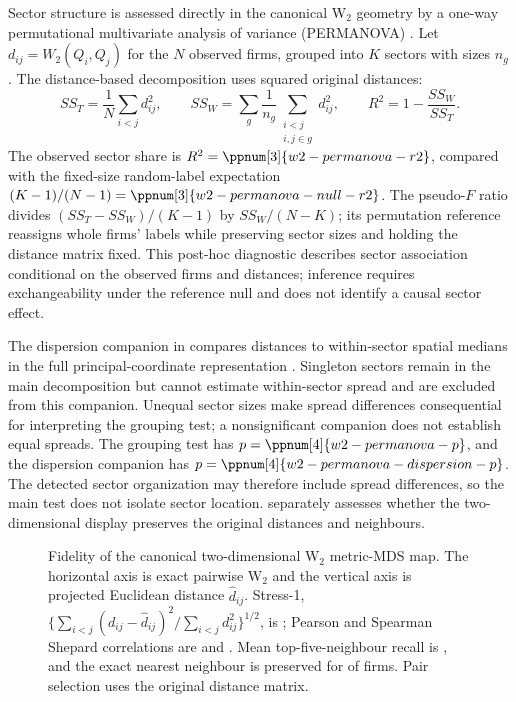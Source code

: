 Sector structure is assessed directly in the canonical W$_2$ geometry by a
one-way permutational multivariate analysis of variance (PERMANOVA)
\citep{anderson_permanova_2001}.
Let $d_{ij}=W_2(Q_i,Q_j)$ for the $N$ observed firms, grouped into $K$ sectors
with sizes $n_g$.
The distance-based decomposition uses squared original distances:
\[
  SS_T=\frac{1}{N}\sum_{i<j}d_{ij}^2,\qquad
  SS_W=\sum_g\frac{1}{n_g}\sum_{\substack{i<j\\i,j\in g}}d_{ij}^2,
  \qquad R^2=1-\frac{SS_W}{SS_T}.
\]
The observed sector share is $R^2=\ppnum[3]{w2-permanova-r2}$, compared with
the fixed-size random-label expectation $(K-1)/(N-1)
=\ppnum[3]{w2-permanova-null-r2}$.
The pseudo-$F$ ratio divides $(SS_T-SS_W)/(K-1)$ by $SS_W/(N-K)$;
its permutation reference reassigns whole firms' labels while preserving sector
sizes and holding the distance matrix fixed.
This post-hoc diagnostic describes sector association conditional on the observed
firms and distances; inference requires exchangeability under the reference null
and does not identify a causal sector effect.



The dispersion companion in  compares distances to
within-sector spatial medians in the full principal-coordinate representation
\citep{anderson_dispersion_2006}.
Singleton sectors remain in the main decomposition but cannot estimate
within-sector spread and are excluded from this companion.
Unequal sector sizes make spread differences consequential for interpreting the
grouping test; a nonsignificant companion does not establish equal spreads.
The grouping test has $p=\ppnum[4]{w2-permanova-p}$, and the dispersion
companion has $p=\ppnum[4]{w2-permanova-dispersion-p}$.
The detected sector organization may therefore include spread differences, so
the main test does not isolate sector location.
 separately assesses whether the
two-dimensional display preserves the original distances and neighbours.

\begin{figure}[H]
  \centering
  \caption{Fidelity of the canonical two-dimensional W$_2$ metric-MDS map. The
    horizontal axis is exact pairwise W$_2$ and the vertical axis is projected
    Euclidean distance $\hat d_{ij}$. Stress-1,
    $\{\sum_{i<j}(d_{ij}-\hat d_{ij})^2/\sum_{i<j}d_{ij}^2\}^{1/2}$,
    is ; Pearson and
    Spearman Shepard correlations are  and
    . Mean top-five-neighbour recall is
    , and the exact nearest neighbour is
    preserved for  of
     firms. Pair selection uses the original distance matrix.
  }
  \label{fig:metric-mds-shepard-diagnostic}
\end{figure}


